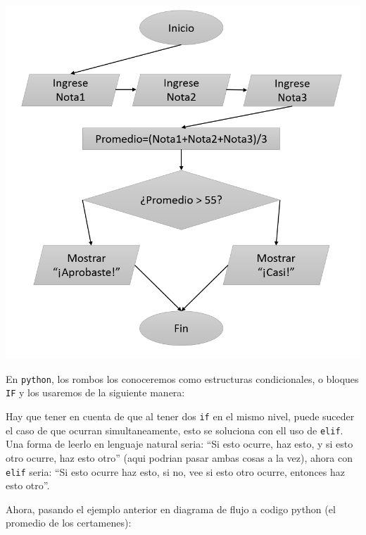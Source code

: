   \begin{center}
    \includegraphics[scale=0.4]{Imagenes/DiagramasFlujo2}
  \end{center}

En  \texttt{python}, los rombos los conoceremos como estructuras condicionales, o bloques \texttt{IF} y los usaremos de la siguiente manera:
 


    
Hay que tener en cuenta de que al tener dos \texttt{if} en el mismo nivel, puede suceder el caso de que ocurran simultaneamente, esto se soluciona con ell uso de
\texttt{elif}. Una forma de leerlo en lenguaje natural seria: ``Si esto ocurre, haz esto, y si esto otro ocurre, haz esto otro'' (aqui podrian pasar ambas cosas
a la vez), ahora con \texttt{elif} seria: ``Si esto ocurre haz esto, si no, vee si esto otro ocurre, entonces haz esto otro''.

Ahora, pasando el ejemplo anterior en diagrama de flujo a codigo python (el promedio de los certamenes):





